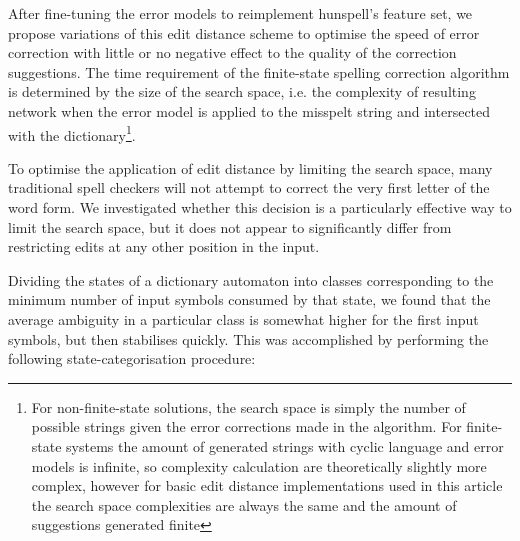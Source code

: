 \documentclass[free]{flammie}
\begin{document}
After fine-tuning the error models to reimplement hunspell's feature set, we
propose variations of this edit distance scheme to optimise the
speed of error correction with little or no negative effect to the quality of
the correction suggestions. The time requirement of the
finite-state spelling correction algorithm is determined by the size of the
search space,
i.e. the complexity of resulting network when the error model is applied to the
misspelt string and intersected with the dictionary\footnote{For non-finite-state
solutions, the search space is simply the number of
possible strings given the error corrections made in the algorithm. For
finite-state systems the amount of generated strings with cyclic language and
error models is infinite, so complexity calculation are theoretically slightly
more complex, however for basic edit distance implementations used in this
article the search space complexities are always the same and the amount of
suggestions generated finite}.

To optimise the application of edit distance by limiting the search space, many
traditional spell checkers will not attempt to correct the very first letter of
the word form. We investigated whether this decision is a particularly
effective way to limit the search space, but it does not appear to
significantly differ from restricting edits at any other position in the input.

Dividing the states of a dictionary automaton into classes corresponding to
the minimum number of input symbols consumed by that state, we found that
the average ambiguity in a particular class is somewhat higher for the first
input symbols, but then stabilises quickly. This was accomplished by
performing the following
state-categorisation procedure:

\end{document}

